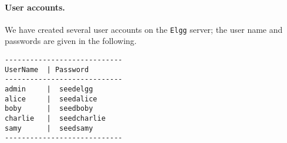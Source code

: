 

\paragraph{User accounts.}
We have created several user accounts on the {\tt Elgg} server; 
the user name and passwords are given in the following.


\begin{lstlisting}
----------------------------
UserName  | Password
----------------------------
admin     |  seedelgg
alice     |  seedalice 
boby      |  seedboby 
charlie   |  seedcharlie 
samy      |  seedsamy 
----------------------------
\end{lstlisting}




